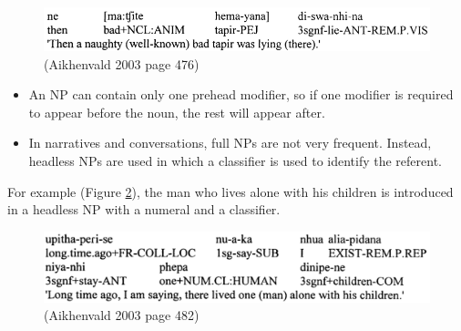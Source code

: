 \documentclass[12pt]{article}
\begin{document}
\begin{figure}[h]
  \centering
  \includegraphics[scale = 0.5]{naughtytapir.png}
    \caption{(Aikhenvald 2003 page 476)}
    \label{naughtytapir}
\end{figure}

  \begin{itemize}
    \item An NP can contain only one prehead modifier, so if one modifier is required to appear before the noun, the rest will appear after.
    \item In narratives and conversations, full NPs are not very frequent. Instead, headless NPs are used in which a classifier is used to identify the referent.
  \end{itemize}
For example (Figure \ref*{oneman}), the man who lives alone with his children is introduced in a headless NP with a numeral and a classifier.

\begin{figure}[h]
  \centering
  \includegraphics[scale = 0.69]{oneman.png}
    \caption{(Aikhenvald 2003 page 482)}
    \label{oneman}
\end{figure}
\end{document}
